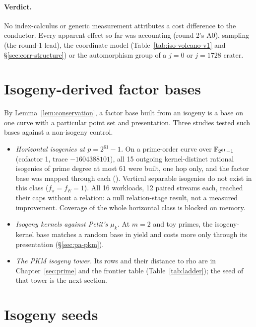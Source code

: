 \paragraph{Verdict.} No index-calculus or generic measurement attributes a
cost difference to the conductor. Every apparent effect so far was
accounting (round 2's A0), sampling (the round-1 lead), the coordinate
model (Table~\ref{tab:iso-volcano-v1} and \S\ref{sec:corr-structure}) or
the automorphism group of a $j=0$ or $j=1728$ crater.

\section{Isogeny-derived factor bases}\label{sec:iso-fb}

By Lemma~\ref{lem:conservation}, a factor base built from an isogeny is a
base on one curve with a particular point set and presentation. Three
studies tested such bases against a non-isogeny control.
\begin{itemize}
\item \emph{Horizontal isogenies at $p=2^{61}-1$.} On a prime-order curve
  over $\mathbb{F}_{2^{61}-1}$ (cofactor 1, trace $-1604388101$), all 15 outgoing
  kernel-distinct rational isogenies of prime degree at most 61 were
  built, one hop only, and the factor base was mapped through each
  (). Vertical separable
  isogenies do not exist in this class ($f_\pi=f_E=1$). All 16 workloads,
  12 paired streams each, reached their caps without a relation: a null
  relation-stage result, not a measured improvement. Coverage of the whole
  horizontal class is blocked on memory.
\item \emph{Isogeny kernels against Petit's $\mu_k$.} At $m=2$ and toy
  primes, the isogeny-kernel base matches a random base in yield and costs
  more only through its presentation (\S\ref{sec:pa-pkm}).
\item \emph{The PKM isogeny tower.} Its rows and their distance to rho are
  in Chapter~\ref{sec:prime} and the frontier table
  (Table~\ref{tab:ladder}); the seed of that tower is the next section.
\end{itemize}

\section{Isogeny seeds}\label{sec:iso-seed}

